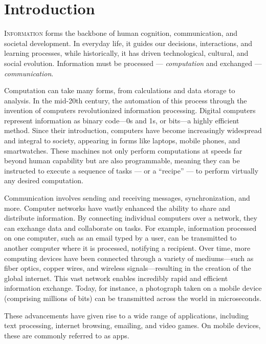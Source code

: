 \chapter{Introduction}
\label{chp:intro}

\lettrine{I}{nformation} forms the backbone of human cognition, communication, and societal development.
In everyday life, it guides our decisions, interactions, and learning processes, while historically, it has driven technological, cultural, and social evolution.
Information must be processed --- \emph{computation} and exchanged --- \emph{communication}.

Computation can take many forms, from calculations and data storage to analysis.
In the mid-20th century, the automation of this process through the invention of computers revolutionized information processing.
Digital computers represent information as binary code—0s and 1s, or bits—a highly efficient method.
Since their introduction, computers have become increasingly widespread and integral to society, appearing in forms like laptops, mobile phones, and smartwatches.
These machines not only perform computations at speeds far beyond human capability but are also programmable, meaning they can be instructed to execute a sequence of tasks --- or a ``recipe'' --- to perform virtually any desired computation.

Communication involves sending and receiving messages, synchronization, and more.
Computer networks have vastly enhanced the ability to share and distribute information.
By connecting individual computers over a network, they can exchange data and collaborate on tasks.
For example, information processed on one computer, such as an email typed by a user, can be transmitted to another computer where it is processed, notifying a recipient.
Over time, more computing devices have been connected through a variety of mediums—such as fiber optics, copper wires, and wireless signals—resulting in the creation of the global internet.
This vast network enables incredibly rapid and efficient information exchange.
Today, for instance, a photograph taken on a mobile device (comprising millions of bits) can be transmitted across the world in microseconds.

These advancements have given rise to a wide range of applications, including text processing, internet browsing, emailing, and video games.
On mobile devices, these are commonly referred to as apps.


